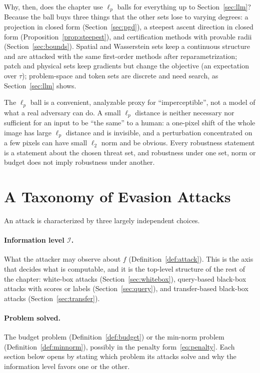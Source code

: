 \documentclass[10pt,a4paper]{extarticle}
\theoremstyle{definition}
\begin{document}
Why, then, does the chapter use \(\ell_p\) balls for everything up to Section~\ref{sec:llm}? Because the ball buys three things that the other sets lose to varying degrees: a projection in closed form (Section~\ref{sec:pgd}), a steepest ascent direction in closed form (Proposition~\ref{prop:steepest}), and certification methods with provable radii (Section~\ref{sec:bounds}). Spatial and Wasserstein sets keep a continuous structure and are attacked with the same first-order methods after reparametrization; patch and physical sets keep gradients but change the objective (an expectation over \(\tau\)); problem-space and token sets are discrete and need search, as Section~\ref{sec:llm} shows.

\begin{warnbox}
The \(\ell_p\) ball is a convenient, analyzable proxy for \enquote{imperceptible}, not a model of what a real adversary can do. A small \(\ell_p\) distance is neither necessary nor sufficient for an input to be \enquote{the same} to a human: a one-pixel shift of the whole image has large \(\ell_p\) distance and is invisible, and a perturbation concentrated on a few pixels can have small \(\ell_2\) norm and be obvious. Every robustness statement is a statement about the chosen threat set, and robustness under one set, norm or budget does not imply robustness under another.
\end{warnbox}

\section{A Taxonomy of Evasion Attacks}\label{sec:taxonomy}

An attack is characterized by three largely independent choices.

\paragraph{Information level \(\mathcal{I}\).} What the attacker may observe about \(f\) (Definition~\ref{def:attack}). This is the axis that decides what is computable, and it is the top-level structure of the rest of the chapter: white-box attacks (Section~\ref{sec:whitebox}), query-based black-box attacks with scores or labels (Section~\ref{sec:query}), and transfer-based black-box attacks (Section~\ref{sec:transfer}).

\paragraph{Problem solved.} The budget problem (Definition~\ref{def:budget}) or the min-norm problem (Definition~\ref{def:minnorm}), possibly in the penalty form~\eqref{eq:penalty}. Each section below opens by stating which problem its attacks solve and why the information level favors one or the other.
\end{document}
